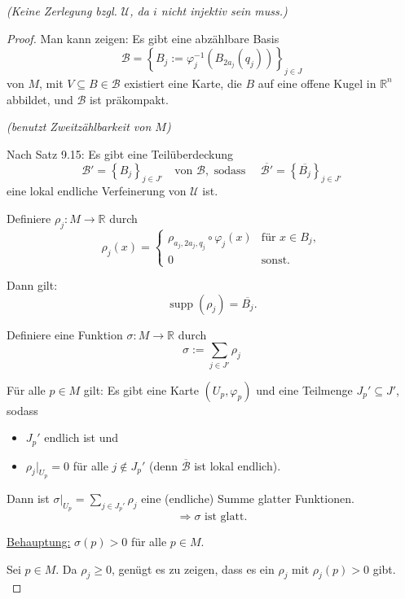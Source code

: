 \documentclass[fleqn, 12pt, letterpaper]{article}
\begin{document}
\textit{\small{(Keine Zerlegung bzgl. $\mathcal{U}$, da $i$ nicht injektiv sein muss.)}}

\begin{proof}
Man kann zeigen: Es gibt eine abzählbare Basis 
\[
\mathcal{B} = \left\{ B_j := \varphi_j^{-1}(B_{2a_j}(q_j)) \right\}_{j \in J}
\]
von $M$, mit $V \subseteq B \in \mathcal{B}$ existiert eine Karte, die $B$ auf eine offene Kugel in $\mathbb{R}^n$ abbildet, und $\mathcal{B}$ ist präkompakt.

\medskip

\textit{(benutzt Zweitzählbarkeit von $M$)}

\medskip

Nach Satz 9.15: Es gibt eine Teilüberdeckung 
\[
\mathcal{B}' = \left\{ B_{j} \right\}_{j \in J'}
\quad \text{von } \mathcal{B}, \text{ sodass } 
\quad \overline{\mathcal{B}'} = \left\{ \overline{B_{j}} \right\}_{j \in J'}
\]
eine lokal endliche Verfeinerung von $\mathcal{U}$ ist.

\medskip

Definiere $\rho_j \colon M \to \mathbb{R}$ durch
\[
\rho_j(x) =
\begin{cases}
\rho_{a_j, 2a_j, q_j} \circ \varphi_j(x) & \text{für } x \in B_j, \\
0 & \text{sonst}.
\end{cases}
\]

Dann gilt:
\[
\operatorname{supp}(\rho_j) = \overline{B_j}.
\]

Definiere eine Funktion $\sigma \colon M \to \mathbb{R}$ durch
\[
\sigma := \sum_{j \in J'} \rho_j
\]

Für alle $p \in M$ gilt: Es gibt eine Karte $(U_p, \varphi_p)$ und eine Teilmenge $J_p' \subseteq J'$, sodass
\begin{itemize}
    \item $J_p'$ endlich ist und
    \item $\rho_j|_{U_p} = 0$ für alle $j \notin J_p'$ \quad (denn $\overline{\mathcal{B}}$ ist lokal endlich).
\end{itemize}

Dann ist $\sigma|_{U_p} = \sum_{j \in J_p'} \rho_j$ eine (endliche) Summe glatter Funktionen.
\[
\Rightarrow \sigma \text{ ist glatt}.
\]

\underline{Behauptung:} $\sigma(p) > 0$ für alle $p \in M$.

Sei $p \in M$. Da $\rho_j \geq 0$, genügt es zu zeigen, dass es ein $\rho_j$ mit $\rho_j(p) > 0$ gibt.\\


\end{proof}
\end{document}
